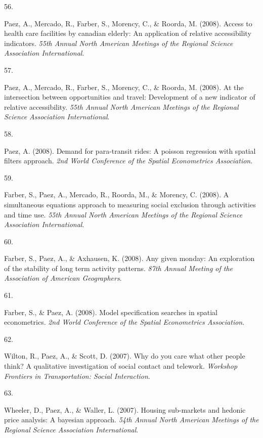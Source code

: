 \documentclass[10pt,a4paper,]{twentysecondcv}
\newlength{\csllabelwidth}
\newcommand{\CSLLeftMargin}[1]{\parbox[t]{\csllabelwidth}{#1}}
\newcommand{\CSLRightInline}[1]{\parbox[t]{\linewidth - \csllabelwidth}{#1}}
\begin{document}
\leavevmode{}%
\CSLLeftMargin{56. }%
\CSLRightInline{Paez, A., Mercado, R., Farber, S., Morency, C., \&
Roorda, M. (2008). Access to health care facilities by canadian elderly:
An application of relative accessibility indicators. \emph{55th Annual
North American Meetings of the Regional Science Association
International}.}

\leavevmode{}%
\CSLLeftMargin{57. }%
\CSLRightInline{Paez, A., Mercado, R., Farber, S., Morency, C., \&
Roorda, M. (2008). At the intersection between opportunities and travel:
Development of a new indicator of relative accessibility. \emph{55th
Annual North American Meetings of the Regional Science Association
International}.}

\leavevmode{}%
\CSLLeftMargin{58. }%
\CSLRightInline{Paez, A. (2008). Demand for para-transit rides: A
poisson regression with spatial filters approach. \emph{2nd World
Conference of the Spatial Econometrics Association}.}

\leavevmode{}%
\CSLLeftMargin{59. }%
\CSLRightInline{Farber, S., Paez, A., Mercado, R., Roorda, M., \&
Morency, C. (2008). A simultaneous equations approach to measuring
social exclusion through activities and time use. \emph{55th Annual
North American Meetings of the Regional Science Association
International}.}

\leavevmode{}%
\CSLLeftMargin{60. }%
\CSLRightInline{Farber, S., Paez, A., \& Axhausen, K. (2008). Any given
monday: An exploration of the stability of long term activity patterns.
\emph{87th Annual Meeting of the Association of American Geographers}.}

\leavevmode{}%
\CSLLeftMargin{61. }%
\CSLRightInline{Farber, S., \& Paez, A. (2008). Model specification
searches in spatial econometrics. \emph{2nd World Conference of the
Spatial Econometrics Association}.}

\leavevmode{}%
\CSLLeftMargin{62. }%
\CSLRightInline{Wilton, R., Paez, A., \& Scott, D. (2007). Why do you
care what other people think? A qualitative investigation of social
contact and telework. \emph{Workshop Frontiers in Transportation: Social
Interaction}.}

\leavevmode{}%
\CSLLeftMargin{63. }%
\CSLRightInline{Wheeler, D., Paez, A., \& Waller, L. (2007). Housing
sub-markets and hedonic price analysis: A bayesian approach. \emph{54th
Annual North American Meetings of the Regional Science Association
International}.}
\end{document}

